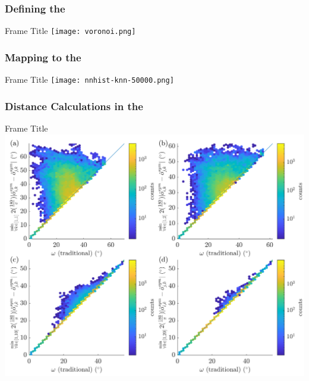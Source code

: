 \documentclass{beamer}
\begin{document}
\subsubsection*{Defining the }

\begin{frame}{Frame Title}
\centering
\texttt{[image: voronoi.png]}
\end{frame}

\subsubsection*{Mapping  to the }

\begin{frame}{Frame Title}
\centering
\texttt{[image: nnhist-knn-50000.png]}
\end{frame}

\subsubsection*{Distance Calculations in the }

\begin{frame}{Frame Title}
\centering
\includegraphics[height=0.85\textheight]{figures/dist-ensemble-k1-2-10-20.png}
\end{frame}
\end{document}
